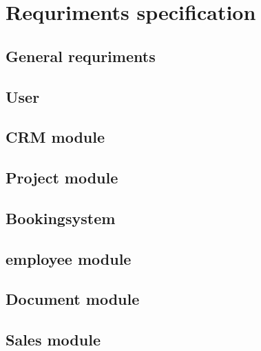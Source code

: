 \section{Requriments specification}

\subsection{General requriments}


\subsection{User}

\subsection{CRM module}

\subsection{Project module}

\subsection{Bookingsystem}

\subsection{employee module}

\subsection{Document module}

\subsection{Sales module}







